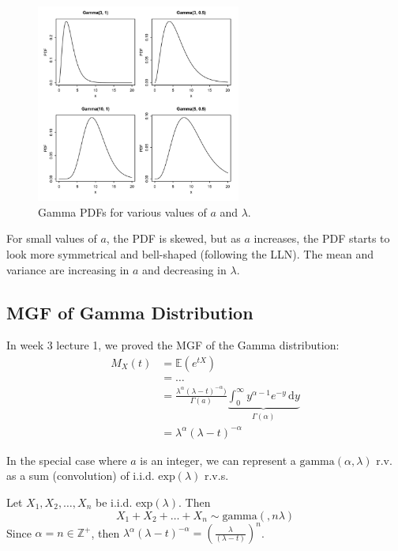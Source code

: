 \documentclass{article}
\begin{document}
\begin{figure}[H]
    \centering
    \includegraphics[width=0.6\textwidth]{Images/Gammadist.png}
    \caption{Gamma PDFs for various values of $a$ and $\lambda$.}
    \label{fig:7-gammadist}
\end{figure} 

\noindent For small values of $a$, the PDF is skewed, but as $a$ increases, the PDF starts to look more symmetrical and bell-shaped (following the LLN). The mean and variance are increasing in $a$ and decreasing in $\lambda$. 

\subsection{MGF of Gamma Distribution}
In week 3 lecture 1, we proved the MGF of the Gamma distribution: \begin{align*}
    M_X (t) &= \mathbb{E}(e^{tX}) \\ 
    &= \dots \\ 
    &= \frac{\lambda^{\alpha}(\lambda - t)^{-\alpha})}{\Gamma (a)} \underbrace{\int_{0}^{\infty} y^{\alpha-1}e^{-y} \, \mathrm{d}y}_{\Gamma (\alpha)} \\ 
    &= \lambda^{\alpha}(\lambda - t)^{-\alpha}
\end{align*}

\noindent In the special case where $a$ is an integer, we can represent a $\text{gamma}(\alpha, \lambda)$ r.v. as a sum (convolution) of i.i.d. $\text{exp}(\lambda)$ r.v.s. 

\begin{theorem}\label{thm:7-gammaexp}
    Let $X_{1}, X_{2}, \dots , X_n$ be i.i.d. $\text{exp}(\lambda)$. Then \begin{equation*}
        X_{1} + X_{2} +\dots + X_n \sim \text{gamma}(,n\lambda)
    \end{equation*} Since $\alpha = n \in \mathbb{Z}^{+}$, then $\lambda^{\alpha}(\lambda - t)^{-\alpha} = \left(\frac{\lambda}{(\lambda - t)}\right)^{n}$. 
\end{theorem}
\end{document}
